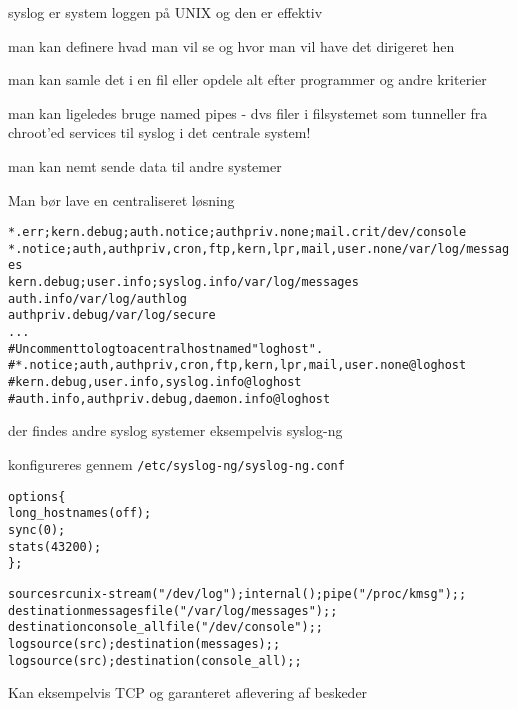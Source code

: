\documentclass[Screen16to9,17pt]{foils}
\begin{document}
\begin{list1}
\item syslog er system loggen på UNIX og den er effektiv
  \begin{list2}
\item man kan definere hvad man vil se og hvor man vil have det
  dirigeret hen
\item man kan samle det i en fil eller opdele alt efter programmer og
  andre kriterier
\item man kan ligeledes bruge named pipes - dvs filer i filsystemet
  som tunneller fra chroot'ed services til syslog i det centrale system!
\item man kan nemt sende data til andre systemer
  \end{list2}
\item Man bør lave en centraliseret løsning
\end{list1}

\begin{alltt}
\small
*.err;kern.debug;auth.notice;authpriv.none;mail.crit    /dev/console
*.notice;auth,authpriv,cron,ftp,kern,lpr,mail,user.none /var/log/messages
kern.debug;user.info;syslog.info                        /var/log/messages
auth.info                                               /var/log/authlog
authpriv.debug                                          /var/log/secure
...
# Uncomment to log to a central host named "loghost".
#*.notice;auth,authpriv,cron,ftp,kern,lpr,mail,user.none        @loghost
#kern.debug,user.info,syslog.info                               @loghost
#auth.info,authpriv.debug,daemon.info                           @loghost
\end{alltt}


\begin{list2}
\item der findes andre syslog systemer eksempelvis syslog-ng
\item konfigureres gennem \verb+/etc/syslog-ng/syslog-ng.conf+
\end{list2}

\begin{alltt}
\small
options \{
        long_hostnames(off);
        sync(0);
        stats(43200);
\};

source src { unix-stream("/dev/log"); internal(); pipe("/proc/kmsg"); };
destination messages { file("/var/log/messages"); };
destination console_all { file("/dev/console"); };
log { source(src); destination(messages); };
log { source(src); destination(console_all); };
\end{alltt}
Kan eksempelvis TCP og garanteret aflevering af beskeder
\end{document}
